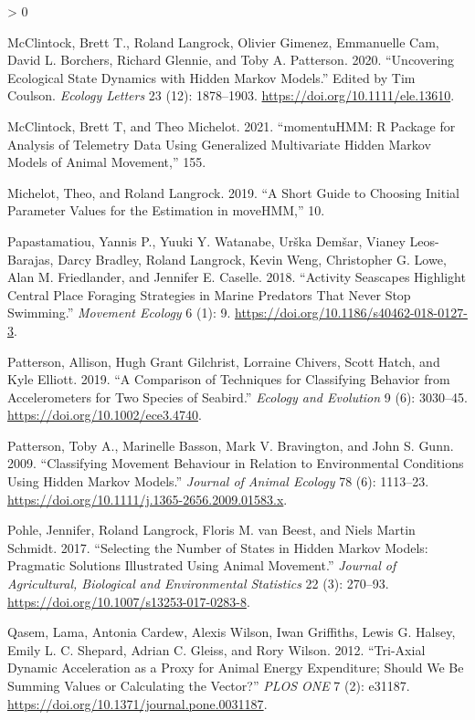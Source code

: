\documentclass[english,msc,numbers,hidelinks]{coppe}
\newlength{\cslhangindent}
\newenvironment{CSLReferences}[2] %
 {%
  \setlength{\parindent}{0pt}
  \ifodd #1 \everypar{\setlength{\hangindent}{\cslhangindent}}\ignorespaces\fi
  \ifnum #2 > 0
  \setlength{\parskip}{#2\baselineskip}
  \fi
 }%
 {}
\begin{document}
\begin{CSLReferences}{1}{0}
  \leavevmode\hypertarget{ref-mcclintock2020}{}%
  McClintock, Brett T., Roland Langrock, Olivier Gimenez, Emmanuelle Cam, David L. Borchers, Richard Glennie, and Toby A. Patterson. 2020. {``Uncovering Ecological State Dynamics with Hidden Markov Models.''} Edited by Tim Coulson. \emph{Ecology Letters} 23 (12): 1878--1903. \url{https://doi.org/10.1111/ele.13610}.

  \leavevmode\hypertarget{ref-mcclintock2021}{}%
  McClintock, Brett T, and Theo Michelot. 2021. {``momentuHMM: R Package for Analysis of Telemetry Data Using Generalized Multivariate Hidden Markov Models of Animal Movement,''} 155.

  \leavevmode\hypertarget{ref-michelot2019}{}%
  Michelot, Theo, and Roland Langrock. 2019. {``A Short Guide to Choosing Initial Parameter Values for the Estimation in moveHMM,''} 10.

  \leavevmode\hypertarget{ref-papastamatiou2018}{}%
  Papastamatiou, Yannis P., Yuuki Y. Watanabe, Urška Demšar, Vianey Leos-Barajas, Darcy Bradley, Roland Langrock, Kevin Weng, Christopher G. Lowe, Alan M. Friedlander, and Jennifer E. Caselle. 2018. {``Activity Seascapes Highlight Central Place Foraging Strategies in Marine Predators That Never Stop Swimming.''} \emph{Movement Ecology} 6 (1): 9. \url{https://doi.org/10.1186/s40462-018-0127-3}.

  \leavevmode\hypertarget{ref-patterson2019}{}%
  Patterson, Allison, Hugh Grant Gilchrist, Lorraine Chivers, Scott Hatch, and Kyle Elliott. 2019. {``A Comparison of Techniques for Classifying Behavior from Accelerometers for Two Species of Seabird.''} \emph{Ecology and Evolution} 9 (6): 3030--45. \url{https://doi.org/10.1002/ece3.4740}.

  \leavevmode\hypertarget{ref-patterson2009}{}%
  Patterson, Toby A., Marinelle Basson, Mark V. Bravington, and John S. Gunn. 2009. {``Classifying Movement Behaviour in Relation to Environmental Conditions Using Hidden Markov Models.''} \emph{Journal of Animal Ecology} 78 (6): 1113--23. \url{https://doi.org/10.1111/j.1365-2656.2009.01583.x}.

  \leavevmode\hypertarget{ref-pohle2017}{}%
  Pohle, Jennifer, Roland Langrock, Floris M. van Beest, and Niels Martin Schmidt. 2017. {``Selecting the Number of States in Hidden Markov Models: Pragmatic Solutions Illustrated Using Animal Movement.''} \emph{Journal of Agricultural, Biological and Environmental Statistics} 22 (3): 270--93. \url{https://doi.org/10.1007/s13253-017-0283-8}.

  \leavevmode\hypertarget{ref-qasem2012}{}%
  Qasem, Lama, Antonia Cardew, Alexis Wilson, Iwan Griffiths, Lewis G. Halsey, Emily L. C. Shepard, Adrian C. Gleiss, and Rory Wilson. 2012. {``Tri-Axial Dynamic Acceleration as a Proxy for Animal Energy Expenditure; Should We Be Summing Values or Calculating the Vector?''} \emph{PLOS ONE} 7 (2): e31187. \url{https://doi.org/10.1371/journal.pone.0031187}.


\end{CSLReferences}
\end{document}
